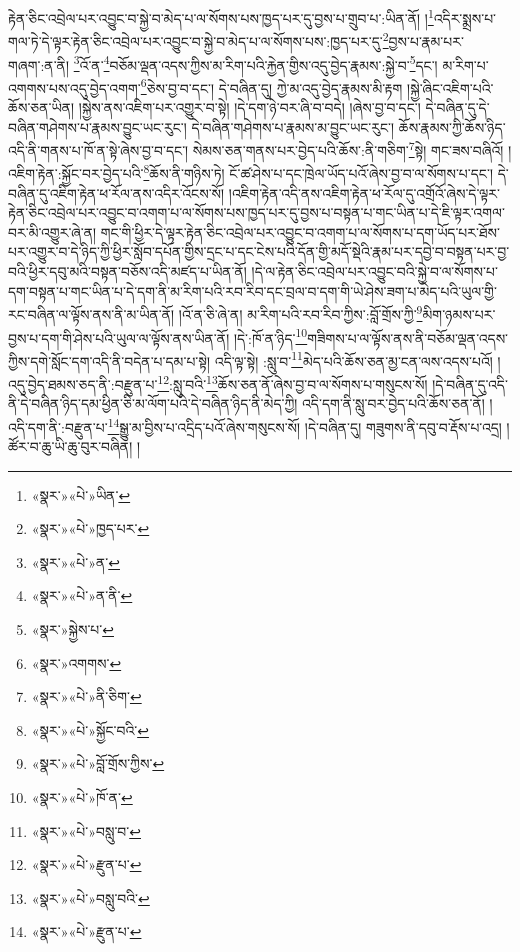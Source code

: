 རྟེན་ཅིང་འབྲེལ་པར་འབྱུང་བ་སྐྱེ་བ་མེད་པ་ལ་སོགས་པས་ཁྱད་པར་དུ་བྱས་པ་གྲུབ་པ་:ཡིན་ནོ། །\footnote{«སྣར་»«པེ་»ཡིན་}འདིར་སྨྲས་པ་གལ་ཏེ་དེ་ལྟར་རྟེན་ཅིང་འབྲེལ་པར་འབྱུང་བ་སྐྱེ་བ་མེད་པ་ལ་སོགས་པས་:ཁྱད་པར་དུ་\footnote{«སྣར་»«པེ་»ཁྱད་པར་}བྱས་པ་རྣམ་པར་གཞག་:ན་ནི། \footnote{«སྣར་»«པེ་»ན་}འོ་ན་\footnote{«སྣར་»«པེ་»ན་ནི་}བཅོམ་ལྡན་འདས་ཀྱིས་མ་རིག་པའི་རྐྱེན་གྱིས་འདུ་བྱེད་རྣམས་:སྐྱེ་བ་\footnote{«སྣར་»སྐྱེས་པ་}དང་། མ་རིག་པ་འགགས་པས་འདུ་བྱེད་འགག་\footnote{«སྣར་»འགགས་}ཅེས་བྱ་བ་དང་། དེ་བཞིན་དུ། ཀྱེ་མ་འདུ་བྱེད་རྣམས་མི་རྟག །སྐྱེ་ཞིང་འཇིག་པའི་ཆོས་ཅན་ཡིན། །སྐྱེས་ནས་འཇིག་པར་འགྱུར་བ་སྟེ། །དེ་དག་ཉེ་བར་ཞི་བ་བདེ། །ཞེས་བྱ་བ་དང་། དེ་བཞིན་དུ་དེ་བཞིན་གཤེགས་པ་རྣམས་བྱུང་ཡང་རུང་། དེ་བཞིན་གཤེགས་པ་རྣམས་མ་བྱུང་ཡང་རུང་། ཆོས་རྣམས་ཀྱི་ཆོས་ཉིད་འདི་ནི་གནས་པ་ཁོ་ན་སྟེ་ཞེས་བྱ་བ་དང་། སེམས་ཅན་གནས་པར་བྱེད་པའི་ཆོས་:ནི་གཅིག་\footnote{«སྣར་»«པེ་»ནི་ཅིག་}སྟེ། གང་ཟས་བཞིའོ། །འཇིག་རྟེན་:སྐྱོང་བར་བྱེད་པའི་\footnote{«སྣར་»«པེ་»སྐྱོང་བའི་}ཆོས་ནི་གཉིས་ཏེ། ངོ་ཚ་ཤེས་པ་དང་ཁྲེལ་ཡོད་པའོ་ཞེས་བྱ་བ་ལ་སོགས་པ་དང་། དེ་བཞིན་དུ་འཇིག་རྟེན་ཕ་རོལ་ནས་འདིར་འོངས་སོ། །འཇིག་རྟེན་འདི་ནས་འཇིག་རྟེན་ཕ་རོལ་དུ་འགྲོའོ་ཞེས་དེ་ལྟར་རྟེན་ཅིང་འབྲེལ་པར་འབྱུང་བ་འགག་པ་ལ་སོགས་པས་ཁྱད་པར་དུ་བྱས་པ་བསྟན་པ་གང་ཡིན་པ་དེ་ཇི་ལྟར་འགལ་བར་མི་འགྱུར་ཞེ་ན། གང་གི་ཕྱིར་དེ་ལྟར་རྟེན་ཅིང་འབྲེལ་པར་འབྱུང་བ་འགག་པ་ལ་སོགས་པ་དག་ཡོད་པར་ཐོས་པར་འགྱུར་བ་དེ་ཉིད་ཀྱི་ཕྱིར་སློབ་དཔོན་གྱིས་དྲང་པ་དང་ངེས་པའི་དོན་གྱི་མདོ་སྡེའི་རྣམ་པར་དབྱེ་བ་བསྟན་པར་བྱ་བའི་ཕྱིར་དབུ་མའི་བསྟན་བཅོས་འདི་མཛད་པ་ཡིན་ནོ། །དེ་ལ་རྟེན་ཅིང་འབྲེལ་པར་འབྱུང་བའི་སྐྱེ་བ་ལ་སོགས་པ་དག་བསྟན་པ་གང་ཡིན་པ་དེ་དག་ནི་མ་རིག་པའི་རབ་རིབ་དང་བྲལ་བ་དག་གི་ཡེ་ཤེས་ཟག་པ་མེད་པའི་ཡུལ་གྱི་རང་བཞིན་ལ་ལྟོས་ནས་ནི་མ་ཡིན་ནོ། །འོ་ན་ཅི་ཞེ་ན། མ་རིག་པའི་རབ་རིབ་ཀྱིས་:བློ་གྲོས་ཀྱི་\footnote{«སྣར་»«པེ་»བློ་གྲོས་ཀྱིས་}མིག་ཉམས་པར་བྱས་པ་དག་གི་ཤེས་པའི་ཡུལ་ལ་ལྟོས་ནས་ཡིན་ནོ། །དེ་:ཁོ་ན་ཉིད་\footnote{«སྣར་»«པེ་»ཁོ་ན་}གཟིགས་པ་ལ་ལྟོས་ནས་ནི་བཅོམ་ལྡན་འདས་ཀྱིས་དགེ་སློང་དག་འདི་ནི་བདེན་པ་དམ་པ་སྟེ། འདི་ལྟ་སྟེ། :སླུ་བ་\footnote{«སྣར་»«པེ་»བསླུ་བ་}མེད་པའི་ཆོས་ཅན་མྱ་ངན་ལས་འདས་པའོ། །འདུ་བྱེད་ཐམས་ཅད་ནི་:བརྫུན་པ་\footnote{«སྣར་»«པེ་»རྫུན་པ་}:སླུ་བའི་\footnote{«སྣར་»«པེ་»བསླུ་བའི་}ཆོས་ཅན་ནོ་ཞེས་བྱ་བ་ལ་སོགས་པ་གསུངས་སོ། །དེ་བཞིན་དུ་འདི་ནི་དེ་བཞིན་ཉིད་དམ་ཕྱིན་ཅི་མ་ལོག་པའི་དེ་བཞིན་ཉིད་ནི་མེད་ཀྱི། འདི་དག་ནི་སླུ་བར་བྱེད་པའི་ཆོས་ཅན་ནོ། །འདི་དག་ནི་:བརྫུན་པ་\footnote{«སྣར་»«པེ་»རྫུན་པ་}སྒྱུ་མ་བྱིས་པ་འདྲིད་པའོ་ཞེས་གསུངས་སོ། །དེ་བཞིན་དུ། གཟུགས་ནི་དབུ་བ་རྡོས་པ་འདྲ། །ཚོར་བ་ཆུ་ཡི་ཆུ་བུར་བཞིན། །
